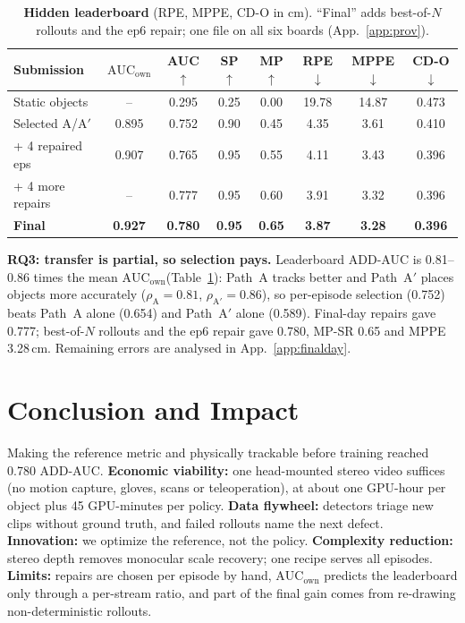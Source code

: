 \documentclass[10pt]{nvidiaextabstract}
\newcommand{\ownauc}{\ensuremath{\mathrm{AUC}_{\text{own}}}\xspace}
\begin{document}
\begin{table}[t]
  \centering\scriptsize
  \setlength{\tabcolsep}{1.6pt}
  \begin{tabular}{@{}lccccccc@{}}
    \toprule
    \textbf{Submission} & \textbf{\ownauc} & \textbf{AUC}$\uparrow$ & \textbf{SP}$\uparrow$ & \textbf{MP}$\uparrow$ & \textbf{RPE}$\downarrow$ & \textbf{MPPE}$\downarrow$ & \textbf{CD-O}$\downarrow$ \\
    \midrule
    Static objects & -- & 0.295 & 0.25 & 0.00 & 19.78 & 14.87 & 0.473 \\
    Selected A/A$'$ & 0.895 & 0.752 & 0.90 & 0.45 & 4.35 & 3.61 & 0.410 \\
    + 4 repaired eps & 0.907 & 0.765 & 0.95 & 0.55 & 4.11 & 3.43 & 0.396 \\
    + 4 more repairs & -- & 0.777 & 0.95 & 0.60 & 3.91 & 3.32 & 0.396 \\
    \textbf{Final} & \textbf{0.927} & \textbf{0.780} & \textbf{0.95} & \textbf{0.65} & \textbf{3.87} & \textbf{3.28} & \textbf{0.396} \\
    \bottomrule
  \end{tabular}
  \vspace{-2mm}
  \caption{\textbf{Hidden leaderboard} (RPE, MPPE, CD-O in cm). ``Final'' adds best-of-$N$ rollouts and the ep6 repair; one file on all six boards (App.~\ref{app:prov}).}
  \label{tab:kaggle}
  \vspace{-3mm}
\end{table}

\textbf{RQ3: transfer is partial, so selection pays.} Leaderboard ADD-AUC is 0.81--0.86 times the mean \ownauc (Table~\ref{tab:kaggle}): Path~A tracks better and Path~A$'$ places objects more accurately ($\rho_{\text{A}}\!=\!0.81$, $\rho_{\text{A}'}\!=\!0.86$), so per-episode selection (0.752) beats Path~A alone (0.654) and Path~A$'$ alone (0.589). Final-day repairs gave 0.777; best-of-$N$ rollouts and the ep6 repair gave 0.780, MP-SR 0.65 and MPPE 3.28\,cm. Remaining errors are analysed in App.~\ref{app:finalday}.

\section{Conclusion and Impact}
\label{sec:conclusion}

Making the reference metric and physically trackable before training reached 0.780 ADD-AUC. \textbf{Economic viability:} one head-mounted stereo video suffices (no motion capture, gloves, scans or teleoperation), at about one GPU-hour per object plus 45 GPU-minutes per policy. \textbf{Data flywheel:} detectors triage new clips without ground truth, and failed rollouts name the next defect. \textbf{Innovation:} we optimize the reference, not the policy. \textbf{Complexity reduction:} stereo depth removes monocular scale recovery; one recipe serves all episodes. \textbf{Limits:} repairs are chosen per episode by hand, \ownauc predicts the leaderboard only through a per-stream ratio, and part of the final gain comes from re-drawing non-deterministic rollouts.
\end{document}
